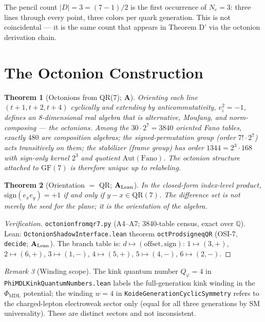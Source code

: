 \documentclass[11pt]{article}
\newtheorem{theorem}{Theorem}[section]
\theoremstyle{remark}
\newtheorem{remark}[theorem]{Remark}
\newcommand{\PHIMDL}{\Phi_{\mathrm{MDL}}}
\newcommand{\lean}[1]{%
  \penalty-100
  \begingroup\def\_{\textunderscore\allowbreak}\texttt{#1}\endgroup}
\newcommand{\CatA}{\textbf{A}}
\newcommand{\CatAL}{\ensuremath{\textbf{A}_{\rm Lean}}}
\begin{document}
The pencil count $|D| = 3 = (7-1)/2$ is the first occurrence of $N_c = 3$:
three lines through every point, three colors per quark generation.
This is not coincidental --- it is the same count that appears in Theorem D'
via the octonion derivation chain.

\section{The Octonion Construction}
\label{sec:octonion}

\begin{theorem}[Octonions from QR(7); \CatA]
\label{thm:B}
Orienting each line $(t{+}1, t{+}2, t{+}4)$ cyclically and extending by
anticommutativity, $e_i^2 = -1$, defines an 8-dimensional real algebra that
is alternative, Moufang, and norm-composing --- the octonions.
Among the $30 \cdot 2^7 = 3840$ oriented Fano tables, exactly $480$ are
composition algebras; the signed-permutation group (order $7!\cdot 2^7$)
acts transitively on them; the stabilizer (frame group) has order
$1344 = 2^3\cdot 168$ with sign-only kernel $2^3$ and quotient
$\mathrm{Aut}(\mathrm{Fano})$.
The octonion structure attached to $\mathrm{GF}(7)$ is therefore unique up
to relabeling.
\end{theorem}

\begin{theorem}[Orientation $=$ QR; \CatAL]
\label{thm:Bprime}
In the closed-form index-level product,
$\mathrm{sign}(e_x e_y) = +1$ if and only if $y - x \in \mathrm{QR}(7)$.
The difference set is not merely the seed for the plane; it is the orientation
of the algebra.
\end{theorem}

\begin{proof}[Verification]
\lean{octonion\_from\_qr7.py} (A4--A7; 3840-table census, exact over $\mathbb{Q}$).
Lean: \lean{OctonionShadowInterface.lean} theorem
\lean{octProd\_sign\_eq\_QR} (OSI-7, \texttt{decide}; \CatAL).
The branch table is: $d \mapsto (\text{offset}, \text{sign})$:
$1\mapsto(3,+)$, $2\mapsto(6,+)$, $3\mapsto(1,-)$, $4\mapsto(5,+)$,
$5\mapsto(4,-)$, $6\mapsto(2,-)$.
\end{proof}

\begin{remark}[Winding scope]
The kink quantum number $Q_\varphi = 4$ in
\lean{PhiMDLKinkQuantumNumbers.lean}
labels the full-generation kink winding in the $\PHIMDL$ potential;
the winding $w = 4$ in \lean{KoideGenerationCyclicSymmetry} refers to the
charged-lepton electroweak sector only (equal for all three generations by
SM universality). These are distinct sectors and not inconsistent.
\end{remark}
\end{document}

